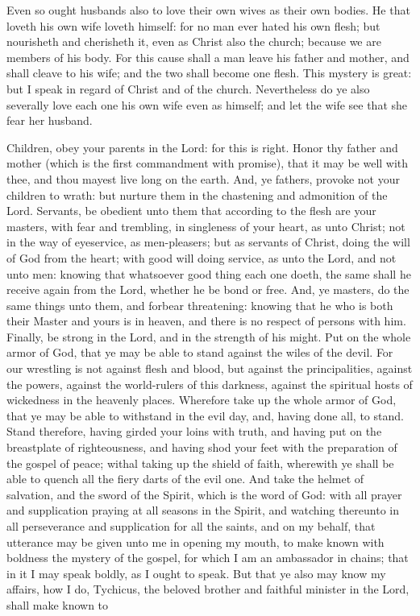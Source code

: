 Even so ought husbands also to love their own wives as their own bodies. He that loveth his own wife loveth himself: for no man ever hated his own flesh; but nourisheth and cherisheth it, even as Christ also the church; because we are members of his body. For this cause shall a man leave his father and mother, and shall cleave to his wife; and the two shall become one flesh. This mystery is great: but I speak in regard of Christ and of the church. Nevertheless do ye also severally love each one his own wife even as himself; and let the wife see that she fear her husband. 

Children, obey your parents in the Lord: for this is right. Honor thy father and mother (which is the first commandment with promise), that it may be well with thee, and thou mayest live long on the earth. And, ye fathers, provoke not your children to wrath: but nurture them in the chastening and admonition of the Lord.  Servants, be obedient unto them that according to the flesh are your masters, with fear and trembling, in singleness of your heart, as unto Christ; not in the way of eyeservice, as men-pleasers; but as servants of Christ, doing the will of God from the heart; with good will doing service, as unto the Lord, and not unto men: knowing that whatsoever good thing each one doeth, the same shall he receive again from the Lord, whether he be bond or free. And, ye masters, do the same things unto them, and forbear threatening: knowing that he who is both their Master and yours is in heaven, and there is no respect of persons with him.  Finally, be strong in the Lord, and in the strength of his might. Put on the whole armor of God, that ye may be able to stand against the wiles of the devil. For our wrestling is not against flesh and blood, but against the principalities, against the powers, against the world-rulers of this darkness, against the spiritual hosts of wickedness in the heavenly places. Wherefore take up the whole armor of God, that ye may be able to withstand in the evil day, and, having done all, to stand. Stand therefore, having girded your loins with truth, and having put on the breastplate of righteousness, and having shod your feet with the preparation of the gospel of peace; withal taking up the shield of faith, wherewith ye shall be able to quench all the fiery darts of the evil one. And take the helmet of salvation, and the sword of the Spirit, which is the word of God: with all prayer and supplication praying at all seasons in the Spirit, and watching thereunto in all perseverance and supplication for all the saints, and on my behalf, that utterance may be given unto me in opening my mouth, to make known with boldness the mystery of the gospel, for which I am an ambassador in chains; that in it I may speak boldly, as I ought to speak.  But that ye also may know my affairs, how I do, Tychicus, the beloved brother and faithful minister in the Lord, shall make known to 